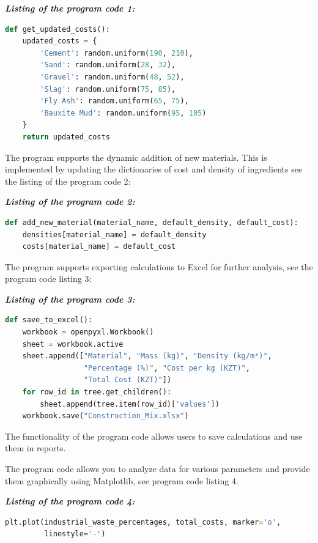 \emph{{\bfseries Listing of the program code 1:}}

\begin{lstlisting}[language=Python]
def get_updated_costs():
    updated_costs = {
        'Cement': random.uniform(190, 210),
        'Sand': random.uniform(28, 32),
        'Gravel': random.uniform(48, 52),
        'Slag': random.uniform(75, 85),
        'Fly Ash': random.uniform(65, 75),
        'Bauxite Mud': random.uniform(95, 105)
    }
    return updated_costs
\end{lstlisting}

The program supports the dynamic addition of new materials. This is
implemented by updating the dictionaries of cost and density of
ingredients see the listing of the program code 2:

\emph{{\bfseries Listing of the program code 2:}}

\begin{lstlisting}[language=Python]
def add_new_material(material_name, default_density, default_cost):
    densities[material_name] = default_density
    costs[material_name] = default_cost
\end{lstlisting}

The program supports exporting calculations to Excel for further
analysis, see the program code listing 3:

\emph{{\bfseries Listing of the program code 3:}}

\begin{lstlisting}[language=Python]
def save_to_excel():
    workbook = openpyxl.Workbook()
    sheet = workbook.active
    sheet.append(["Material", "Mass (kg)", "Density (kg/m³)",
                  "Percentage (%)", "Cost per kg (KZT)",
                  "Total Cost (KZT)"])
    for row_id in tree.get_children():
        sheet.append(tree.item(row_id)['values'])
    workbook.save("Construction_Mix.xlsx")
\end{lstlisting}

The functionality of the program code allows users to save calculations
and use them in reports.

The program code allows you to analyze data for various parameters and
provide them graphically using Matplotlib, see program code listing 4.

\emph{{\bfseries Listing of the program code 4:}}

\begin{lstlisting}[language=Python]
plt.plot(industrial_waste_percentages, total_costs, marker='o',
         linestyle='-')
\end{lstlisting}

